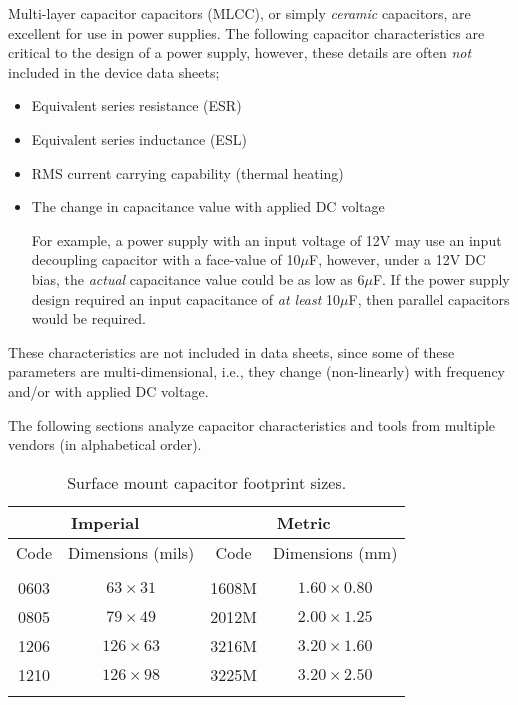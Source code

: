 \documentclass[10pt,twoside]{article}
\begin{document}
Multi-layer capacitor capacitors (MLCC), or simply {\em ceramic}
capacitors, are excellent for use in power supplies. 
The following capacitor characteristics are critical to the
design of a power supply, however, these details are
often {\em not} included in the device data sheets;
%
\begin{itemize}
\item Equivalent series resistance (ESR)
\item Equivalent series inductance (ESL)
\item RMS current carrying capability (thermal heating)
\item The change in capacitance value with applied DC voltage

For example, a power supply with an input voltage of 12V
may use an input decoupling capacitor with a face-value of
10$\mu$F, however, under a 12V DC bias, the {\em actual}
capacitance value could be as low as 6$\mu$F. If the power
supply design required an input capacitance of {\em at least}
10$\mu$F, then parallel capacitors would be required.

\end{itemize}
%
These characteristics are not included in data sheets, since 
some of these parameters are multi-dimensional, i.e., they
change (non-linearly) with frequency and/or with applied DC voltage.

The following sections analyze capacitor characteristics
and tools from multiple vendors (in alphabetical order).



\begin{table}
\caption{Surface mount capacitor footprint sizes.}
\label{tab:smt_footprints}
\begin{center}
\begin{tabular}{|c|c||c|c|}
\hline
\multicolumn{2}{|c||}{Imperial} & \multicolumn{2}{c|}{Metric}\\
\hline
Code & Dimensions (mils)     & Code & Dimensions (mm)\\
\hline\hline
&&&\\
0603 &  $63\times31$ & 1608M & $1.60\times0.80$\\
0805 &  $79\times49$ & 2012M & $2.00\times1.25$\\
1206 & $126\times63$ & 3216M & $3.20\times1.60$\\
1210 & $126\times98$ & 3225M & $3.20\times2.50$\\
&&&\\
\hline
\end{tabular}
\end{center}
\end{table}
\end{document}
